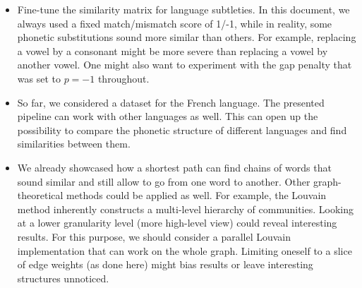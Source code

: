 \begin{itemize}
    \item Fine-tune the similarity matrix for language subtleties. In this document, we always used a fixed match/mismatch score of 1/-1, while in reality, some phonetic substitutions sound more similar than others. For example, replacing a vowel by a consonant might be more severe than replacing a vowel by another vowel. One might also want to experiment with the gap penalty that was set to $p=-1$ throughout.
    
    \item So far, we considered a dataset for the French language. The presented pipeline can work with other languages as well. This can open up the possibility to compare the phonetic structure of different languages and find similarities between them.
    
    \item We already showcased how a shortest path can find chains of words that sound similar and still allow to go from one word to another. Other graph-theoretical methods could be applied as well. For example, the Louvain method inherently constructs a multi-level hierarchy of communities. Looking at a lower granularity level (more high-level view) could reveal interesting results. For this purpose, we should consider a parallel Louvain implementation that can work on the whole graph. Limiting oneself to a slice of edge weights (as done here) might bias results or leave interesting structures unnoticed.
    
\end{itemize}



